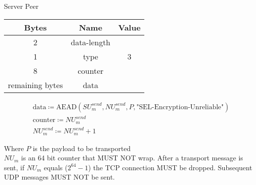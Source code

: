\begin{center}
    Server \textrightarrow Peer\\
    \begin{tabular}{|c|c|c|}
        \hline
        \textbf{Bytes}  & \textbf{Name} & \textbf{Value} \\
        \hline
        2               & data-length   &                \\
        \hline
        1               & type          & 3              \\
        \hline
        8               & counter       &                \\
        \hline
        remaining bytes & data          &                \\
        \hline
    \end{tabular}
\end{center}


\begin{align*}
    & \text{data} \coloneqq \text{AEAD}(\mathit{SU}_{m}^{send}, \mathit{NU}_{m}^{send}, P,
    \text{"SEL-Encryption-Unreliable"})\\
    & \text{counter} \coloneqq \mathit{NU}_{m}^{send}\\
    & \mathit{NU}_{m}^{send} \coloneqq \mathit{NU}_{m}^{send} + 1
\end{align*}


Where $P$ is the payload to be transported\\

$\mathit{NU}_{m}$ is an 64 bit counter that MUST NOT wrap. After a transport message is sent, if $\mathit{NU}_{m}$ equals
($2^{64}-1$) the TCP connection MUST be dropped. Subsequent UDP messages MUST NOT be sent. \\

